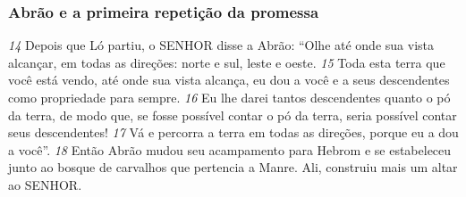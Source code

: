 \bigskip
\subsubsection*{Abrão e a primeira repetição da promessa}
\textit{\tiny 14}
Depois que Ló partiu, o SENHOR disse a Abrão: “Olhe até onde sua vista
alcançar, em todas as direções: norte e sul, leste e oeste. 
\textit{\tiny 15}
Toda esta terra que
você está vendo, até onde sua vista alcança, eu dou a você e a seus descendentes
como propriedade para sempre. 
\textit{\tiny 16}
Eu lhe darei tantos descendentes quanto o pó
da terra, de modo que, se fosse possível contar o pó da terra, seria possível contar
seus descendentes! 
\textit{\tiny 17}
Vá e percorra a terra em todas as direções, porque eu a dou
a você”.
\textit{\tiny 18}
Então Abrão mudou seu acampamento para Hebrom e se estabeleceu junto
ao bosque de carvalhos que pertencia a Manre. Ali, construiu mais um altar ao
SENHOR.


\bigskip
